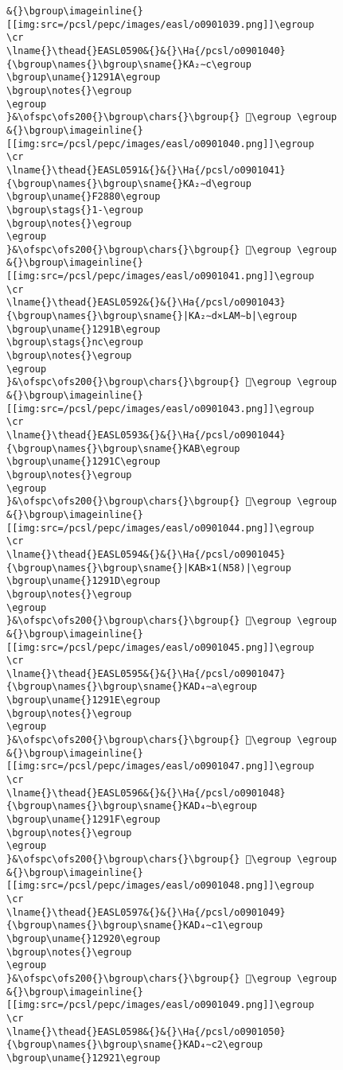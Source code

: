 \begin{verbatim}
&{}\bgroup\imageinline{}[[img:src=/pcsl/pepc/images/easl/o0901039.png]]\egroup
\cr
\lname{}\thead{}EASL0590&{}&{}\Ha{/pcsl/o0901040}{\bgroup\names{}\bgroup\sname{}KA₂∼c\egroup
\bgroup\uname{}1291A\egroup
\bgroup\notes{}\egroup
\egroup
}&\ofspc\ofs200{}\bgroup\chars{}\bgroup{} 𒤚\egroup \egroup
&{}\bgroup\imageinline{}[[img:src=/pcsl/pepc/images/easl/o0901040.png]]\egroup
\cr
\lname{}\thead{}EASL0591&{}&{}\Ha{/pcsl/o0901041}{\bgroup\names{}\bgroup\sname{}KA₂∼d\egroup
\bgroup\uname{}F2880\egroup
\bgroup\stags{}1-\egroup
\bgroup\notes{}\egroup
\egroup
}&\ofspc\ofs200{}\bgroup\chars{}\bgroup{} 󲢀\egroup \egroup
&{}\bgroup\imageinline{}[[img:src=/pcsl/pepc/images/easl/o0901041.png]]\egroup
\cr
\lname{}\thead{}EASL0592&{}&{}\Ha{/pcsl/o0901043}{\bgroup\names{}\bgroup\sname{}|KA₂∼d×LAM∼b|\egroup
\bgroup\uname{}1291B\egroup
\bgroup\stags{}nc\egroup
\bgroup\notes{}\egroup
\egroup
}&\ofspc\ofs200{}\bgroup\chars{}\bgroup{} 𒤛\egroup \egroup
&{}\bgroup\imageinline{}[[img:src=/pcsl/pepc/images/easl/o0901043.png]]\egroup
\cr
\lname{}\thead{}EASL0593&{}&{}\Ha{/pcsl/o0901044}{\bgroup\names{}\bgroup\sname{}KAB\egroup
\bgroup\uname{}1291C\egroup
\bgroup\notes{}\egroup
\egroup
}&\ofspc\ofs200{}\bgroup\chars{}\bgroup{} 𒤜\egroup \egroup
&{}\bgroup\imageinline{}[[img:src=/pcsl/pepc/images/easl/o0901044.png]]\egroup
\cr
\lname{}\thead{}EASL0594&{}&{}\Ha{/pcsl/o0901045}{\bgroup\names{}\bgroup\sname{}|KAB×1(N58)|\egroup
\bgroup\uname{}1291D\egroup
\bgroup\notes{}\egroup
\egroup
}&\ofspc\ofs200{}\bgroup\chars{}\bgroup{} 𒤝\egroup \egroup
&{}\bgroup\imageinline{}[[img:src=/pcsl/pepc/images/easl/o0901045.png]]\egroup
\cr
\lname{}\thead{}EASL0595&{}&{}\Ha{/pcsl/o0901047}{\bgroup\names{}\bgroup\sname{}KAD₄∼a\egroup
\bgroup\uname{}1291E\egroup
\bgroup\notes{}\egroup
\egroup
}&\ofspc\ofs200{}\bgroup\chars{}\bgroup{} 𒤞\egroup \egroup
&{}\bgroup\imageinline{}[[img:src=/pcsl/pepc/images/easl/o0901047.png]]\egroup
\cr
\lname{}\thead{}EASL0596&{}&{}\Ha{/pcsl/o0901048}{\bgroup\names{}\bgroup\sname{}KAD₄∼b\egroup
\bgroup\uname{}1291F\egroup
\bgroup\notes{}\egroup
\egroup
}&\ofspc\ofs200{}\bgroup\chars{}\bgroup{} 𒤟\egroup \egroup
&{}\bgroup\imageinline{}[[img:src=/pcsl/pepc/images/easl/o0901048.png]]\egroup
\cr
\lname{}\thead{}EASL0597&{}&{}\Ha{/pcsl/o0901049}{\bgroup\names{}\bgroup\sname{}KAD₄∼c1\egroup
\bgroup\uname{}12920\egroup
\bgroup\notes{}\egroup
\egroup
}&\ofspc\ofs200{}\bgroup\chars{}\bgroup{} 𒤠\egroup \egroup
&{}\bgroup\imageinline{}[[img:src=/pcsl/pepc/images/easl/o0901049.png]]\egroup
\cr
\lname{}\thead{}EASL0598&{}&{}\Ha{/pcsl/o0901050}{\bgroup\names{}\bgroup\sname{}KAD₄∼c2\egroup
\bgroup\uname{}12921\egroup

\end{verbatim}
